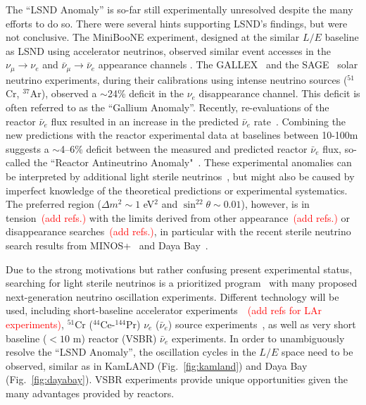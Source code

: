 The ``LSND Anomaly'' is so-far still experimentally unresolved despite the many efforts to do so. 
There were several hints supporting LSND's findings, but were not conclusive. 
The MiniBooNE experiment, designed at the similar $L/E$ baseline as LSND using accelerator neutrinos, observed similar event accesses in the $\nu_{\mu}\rightarrow\nu_e$ and $\bar\nu_{\mu}\rightarrow\bar\nu_e$ appearance channels \cite{MiniBooNE2013}. 
The GALLEX~\cite{GALLEX2010} and the SAGE~\cite{SAGE2009} solar neutrino experiments, during their calibrations using intense neutrino sources ($^{51}$Cr, $^{37}$Ar), observed a $\sim$24\% deficit in the $\nu_e$ disappearance channel. 
This deficit is often referred to as the ``Gallium Anomaly''. 
Recently, re-evaluations of the reactor $\bar\nu_e$ flux resulted in an increase in the predicted $\bar\nu_e$ rate~\cite{Mueller, Huber}. 
Combining the new predictions with the reactor experimental data at baselines between 10-100m suggests a $\sim$4--6\% deficit between the measured and predicted reactor $\bar\nu_e$ flux, so-called the ``Reactor Antineutrino Anomaly"~\cite{Mention2011,Zhang13}. 
These experimental anomalies can be interpreted by additional light sterile neutrinos~\cite{Guinti2011}, but might also be caused by imperfect knowledge of the theoretical predictions or experimental systematics.  
The preferred region ($\Delta{m}^2\sim1$ eV$^2$ and $\sin^22\theta\sim0.01$), however, is in tension~\textcolor{red}{(add refs.)} with the limits derived from other appearance~\textcolor{red}{(add refs.)} or disappearance searches~\textcolor{red}{(add refs.)}, in particular with the recent sterile neutrino search results from MINOS+~\cite{Sousa-Neutrino14} and Daya Bay~\cite{DayaBaySterile}.

Due to the strong motivations but rather confusing present experimental status, searching for light sterile neutrinos is a prioritized program~\cite{sterileWP} with many proposed next-generation neutrino oscillation experiments.
Different technology will be used, including short-baseline accelerator experiments~\cite{nuSTORM,IsoDAR}~\textcolor{red}{(add refs for LAr experiments)}, $^{51}$Cr ($^{44}$Ce-$^{144}$Pr) $\nu_e$ ($\bar\nu_e$) source experiments~\cite{Cribier2011,Dwyer2013,SOX,CeLAND}, as well as very short baseline ($<10$ m) reactor (VSBR) $\bar\nu_e$ experiments. 
In order to unambiguously resolve the ``LSND Anomaly'', the oscillation cycles in the $L/E$ space need to be observed, similar as in KamLAND (Fig.~\ref{fig:kamland}) and Daya Bay (Fig.~\ref{fig:dayabay}). VSBR experiments provide unique opportunities given the many advantages provided by reactors.

